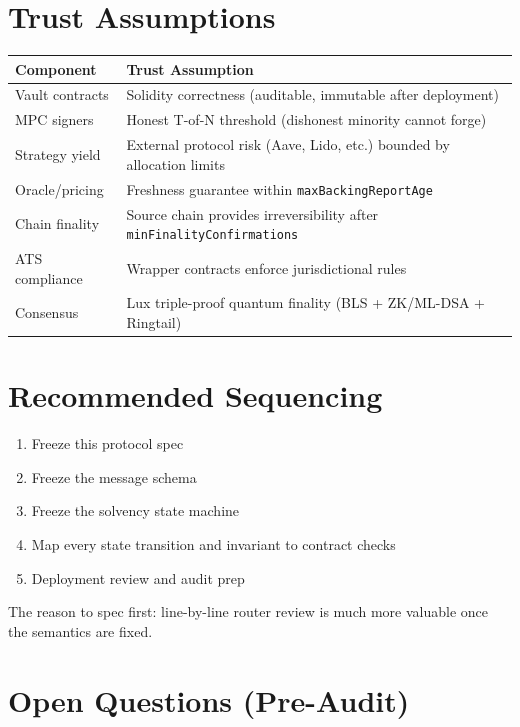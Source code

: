 \documentclass[11pt,a4paper]{article}
\begin{document}
\section{Trust Assumptions}

\begin{center}
\begin{tabular}{lp{9cm}}
\toprule
\textbf{Component} & \textbf{Trust Assumption} \\
\midrule
Vault contracts & Solidity correctness (auditable, immutable after deployment) \\
MPC signers & Honest T-of-N threshold (dishonest minority cannot forge) \\
Strategy yield & External protocol risk (Aave, Lido, etc.) bounded by allocation limits \\
Oracle/pricing & Freshness guarantee within \texttt{maxBackingReportAge} \\
Chain finality & Source chain provides irreversibility after \texttt{minFinalityConfirmations} \\
ATS compliance & Wrapper contracts enforce jurisdictional rules \\
Consensus & Lux triple-proof quantum finality (BLS + ZK/ML-DSA + Ringtail) \\
\bottomrule
\end{tabular}
\end{center}

\section{Recommended Sequencing}

\begin{enumerate}[leftmargin=2em]
\item Freeze this protocol spec
\item Freeze the message schema
\item Freeze the solvency state machine
\item Map every state transition and invariant to contract checks
\item Deployment review and audit prep
\end{enumerate}

The reason to spec first: line-by-line router review is much more valuable once the semantics are fixed.

\section{Open Questions (Pre-Audit)}
\end{document}
